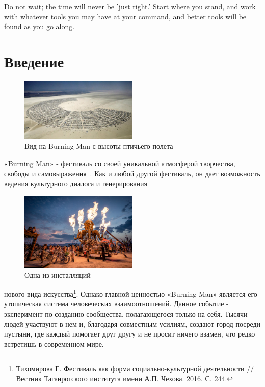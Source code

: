 \documentclass[10pt,a4paper]{report}
\begin{document}
\tableofcontents
\begin{savequote}[45mm]
Do not wait; the time will never be 'just right.' 
Start where you stand, and work with whatever tools 
you may have at your command, and better tools will 
be found as you go along.
\end{savequote}

\chapter{Введение}

\begin{figure}
    \centering   
    \includegraphics[width=0.50\textwidth]{images/burningman1.jpg}
    \caption{Вид на Burning Man с высоты птичьего полета}
    \label{picture:1}
\end{figure}

«Burning Man» - фестиваль со своей уникальной атмосферой творчества, свободы и самовыражения~\cite{gilmore2005afterburn}. 
Как и любой другой 
фестиваль, он дает возможность ведения
культурного диалога и генерирования 

\begin{figure}
    \centering   
    \includegraphics[width=0.50\textwidth]{images/burningman2.jpg}
    \caption{Одна из инсталляций}
    \label{picture:2}
\end{figure}

нового вида
искусства\footnote{Тихомирова Г.
Фестиваль как форма социально-культурной деятельности // Вестник
Таганрогского
института имени А.П. Чехова. 2016. С. 244.}. 
Однако главной ценностью «Burning Man» является его утопическая система
человеческих взаимоотношений. Данное событие - эксперимент по созданию
сообщества, полагающегося только на себя. 
Тысячи людей участвуют в нем и,
благодаря совместным усилиям, создают город посреди пустыни, где каждый
помогает друг другу и не просит ничего взамен, что редко
встретишь в современном мире.
\end{document}
